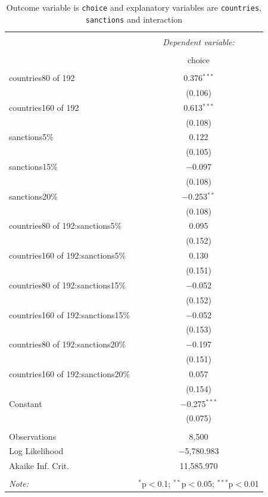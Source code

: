 \documentclass{article} %
\begin{document}
\begin{table}[!htbp] \centering   \caption{Outcome variable is \texttt{choice} and explanatory variables are \texttt{countries}, \texttt{sanctions} and interaction}   \label{} 
\begin{tabular}{@{\extracolsep{5pt}}lc} \\[-1.8ex]\hline \hline \\[-1.8ex]  & \multicolumn{1}{c}{\textit{Dependent variable:}} \\ \cline{2-2} \\[-1.8ex] & choice \\ \hline \\[-1.8ex]  
countries80 of 192 & 0.376$^{***}$ \\   & (0.106) \\   
countries160 of 192 & 0.613$^{***}$ \\   & (0.108) \\   
sanctions5\% & 0.122 \\   & (0.105) \\   
sanctions15\% & $-$0.097 \\   & (0.108) \\    
sanctions20\% & $-$0.253$^{**}$ \\   & (0.108) \\   
countries80 of 192:sanctions5\% & 0.095 \\   & (0.152) \\   
countries160 of 192:sanctions5\% & 0.130 \\   & (0.151) \\   
countries80 of 192:sanctions15\% & $-$0.052 \\   & (0.152) \\   
countries160 of 192:sanctions15\% & $-$0.052 \\   & (0.153) \\   
countries80 of 192:sanctions20\% & $-$0.197 \\   & (0.151) \\   
countries160 of 192:sanctions20\% & 0.057 \\   & (0.154) \\   
Constant & $-$0.275$^{***}$ \\   & (0.075) \\  
\hline \\[-1.8ex] Observations & 8,500 \\ Log Likelihood & $-$5,780.983 \\ Akaike Inf. Crit. & 11,585.970 \\ \hline \hline \\[-1.8ex] \textit{Note:}  & \multicolumn{1}{r}{$^{*}$p$<$0.1; $^{**}$p$<$0.05; $^{***}$p$<$0.01} \\ 
\end{tabular}
\end{table} 
\end{document}
